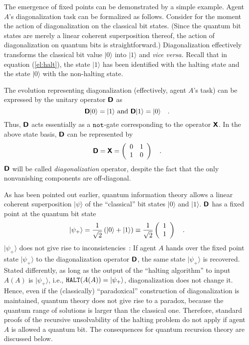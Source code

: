 \documentclass[prl,amsfonts,amsmath,showpacs,showkeys,preprint]{revtex4}
\begin{document}
The emergence of fixed points can be demonstrated by a simple example.
Agent $A$'s diagonalization task can be formalized as
follows. Consider for the moment the action of diagonalization on the
classical bit states. (Since the quantum bit states are merely a linear coherent superposition
thereof, the action of diagonalization on quantum bits is straightforward.)
Diagonalization effectively transforms the classical bit value $\vert 0\rangle$ into $\vert 1\rangle$ and
{\it vice versa.}
Recall that in equation
(\ref{el:halt}),  the state
$\vert 1\rangle$ has been identified  with the halting state
and the state $\vert 0\rangle$ with the non-halting state.

 The evolution representing diagonalization (effectively, agent
$A$'s task) can be expressed by the unitary operator $\textsf{\textbf{D}}$ as
\begin{equation}
\textsf{\textbf{D}} \vert 0 \rangle  =  \vert 1 \rangle \mbox{ and }
\textsf{\textbf{D}} \vert 1 \rangle  =  \vert 0 \rangle\quad .
\end{equation}
Thus, $\textsf{\textbf{D}}$ acts essentially as a ${\tt not}$-gate corresponding to the operator $\textsf{\textbf{X}}$.
In the above state basis, $\textsf{\textbf{D}}$ can be represented by
\begin{equation}
\textsf{\textbf{D}}=  \textsf{\textbf{X}}=
\left(
\begin{array}{cc}
0 & 1\\
1 & 0
\end{array}
\right) \quad .
\end{equation}
$\textsf{\textbf{D}}$ will be called {\em diagonalization} operator, despite the fact
that the only nonvanishing components are off-diagonal.


As has been pointed out earlier,
quantum information theory allows a linear coherent superposition
$\vert \psi \rangle $
of the
``classical'' bit states $\vert 0\rangle $ and $\vert 1 \rangle $.
$\textsf{\textbf{D}}$
has a
fixed point at the quantum bit state
\begin{equation}
\vert \psi_+ \rangle ={ {1\over \sqrt{2}}\left(\vert 0 \rangle +\vert 1 \rangle \right) }
\equiv
{1\over \sqrt{2}} \left(
\begin{array}{c}
1 \\
1
 \end{array}
\right) \quad .
\end{equation}
$\vert \psi_+ \rangle$
does not give rise to inconsistencies~\cite{svozil-paradox}:
If agent $A$ hands over the fixed point state
$\vert \psi_+ \rangle$ to the diagonalization
operator $\textsf{\textbf{D}}$, the same state
$\vert \psi_+ \rangle$ is recovered.
Stated differently, as long as the output of the ``halting
algorithm'' to input $A(A)$ is $\vert \psi_+ \rangle$, i.e., ${\tt HALT} ( A(A) ) = \vert \psi_+ \rangle$, diagonalization does not
change it. Hence, even if the (classically) ``paradoxical'' construction
of diagonalization is maintained, quantum theory does not give rise to a
paradox, because the quantum range of solutions is larger than the
classical one.
Therefore,
standard proofs of the recursive unsolvability of the halting problem
do not apply if agent $A$ is allowed a quantum bit. The consequences for
quantum recursion theory are discussed below.
\end{document}
